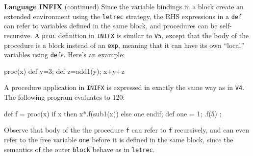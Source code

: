 \begin{minipage}[t]{\sw}
\slidenumber
\LARGE
{\bf Language INFIX} (continued)\exx
Since the variable bindings in a block create an extended environment
using the \verb'letrec' strategy,
the RHS expressions in a \verb'def'
can refer to variables defined in the same block,
and procedures can be self-recursive.\exx
A \verb'proc' definition in \verb'INIFX' is similar to \verb'V5',
except that the body of the procedure is a block instead of an \verb'exp',
meaning that it can have its own ``local'' variables using \verb'def's.
Here's an example:
{\Large
\begin{qv}
proc(x) {def y=3; def z=add1(y); x+y+z}
\end{qv}
}
A procedure application in \verb'INIFX' is expressed
in exactly the same way as in \verb'V4'.
The following program evaluates to 120:
{\Large
\begin{qv}
{
  def f = proc(x)
    {if x then x*.f(sub1(x)) else one endif};
  def one = 1;
  .f(5)
} ;
\end{qv}
}
Observe that body of the the procedure \verb'f' can refer
to \verb'f' recursively,
and can even refer to the free variable \verb'one'
before it is defined in the same block,
since the semantics of the outer \verb'block'
behave as in \verb'letrec'.
\end{minipage}
